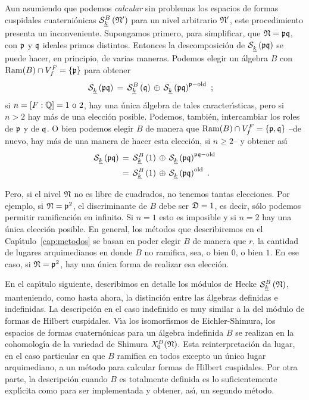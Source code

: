 Aun asumiendo que podemos \emph{calcular} sin problemas los espacios de formas
cuspidales cuaterni\'{o}nicas $\spitzH[B]{k}{\frak{N}'}$ para un nivel
arbitrario $\frak{N}'$, este procedimiento presenta un inconveniente.
Supongamos primero, para simplificar, que $\frak{N}=\frak{p}\frak{q}$, con
$\frak{p}$ y $\frak{q}$ ideales primos distintos. Entonces la
descomposici\'{o}n de $\spitzH{k}{\frak{p}\frak{q}}$ se puede hacer, en
principio, de varias maneras. Podemos elegir un \'{a}lgebra $B$ con
$\Ram(B)\cap\lugares[f]{F}=\{\frak{p}\}$ para obtener
\begin{align*}
	\spitzH{k}{\frak{p}\frak{q}} & \,=\, \spitzH[B]{k}{\frak{q}}\,\oplus\,
		\spitzH{k}{\frak{p}\frak{q}}^{\frak{p}-\oude}
	\text{ ;}
\end{align*}
%
si $n=[F:\bb{Q}]=1\text{ o }2$, hay una \'{u}nica \'{a}lgebra de tales
caracter\'{\i}sticas, pero si $n>2$ hay m\'{a}s de una elecci\'{o}n posible.
Podemos, tambi\'{e}n, intercambiar los roles de $\frak{p}$ y de $\frak{q}$.
O bien podemos elegir $B$ de manera que
$\Ram(B)\cap\lugares[f]{F}=\{\frak{p},\frak{q}\}$ --de nuevo, hay m\'{a}s
de una manera de hacer esta elecci\'{o}n, si $n\geq 2$-- y obtener as\'{\i}
\begin{align*}
	\spitzH{k}{\frak{p}\frak{q}} & \,=\, \spitzH[B]{k}{1}\,\oplus\,
		\spitzH{k}{\frak{p}\frak{q}}^{\frak{p}\frak{q}-\oude} \\
	& \,=\,\spitzH[B]{k}{1}\,\oplus\, \spitzH{k}{\frak{p}\frak{q}}^{\oude}
	\text{ .}
\end{align*}
%

Pero, si el nivel $\frak{N}$ no es libre de cuadrados, no tenemos tantas
elecciones. Por ejemplo, si $\frak{N}=\frak{p}^{2}$, el discriminante de $B$
debe ser $\frak{D}=1$, es decir, s\'{o}lo podemos permitir ramificaci\'{o}n en
infinito. Si $n=1$ esto es imposible y si $n=2$ hay una \'{u}nica elecci\'{o}n
posible. En general, los m\'{e}todos que describiremos en el
Cap\'{\i}tulo~\ref{cap:metodos} se basan en poder elegir $B$ de manera que $r$,
la cantidad de lugares arquimedianos en donde $B$ no ramifica, sea, o bien $0$,
o bien $1$. En ese caso, si $\frak{N}=\frak{p}^{2}$, hay una \'{u}nica forma de
realizar esa elecci\'{o}n.

En el cap\'{\i}tulo siguiente, describimos en detalle los m\'{o}dulos de Hecke
$\spitzH[B]{k}{\frak{N}}$, manteniendo, como hasta ahora, la distinci\'{o}n
entre las \'{a}lgebras definidas e indefinidas. La descripci\'{o}n en el caso
indefinido es muy similar a la del m\'{o}dulo de formas de Hilbert cuspidales.
V\'{\i}a los isomorfismos de Eichler-Shimura, los espacios de formas
cuatern\'{o}nicas para un \'{a}lgebra indefinida $B$ se realizan en la
cohomolog\'{\i}a de la variedad de Shimura $\shimura[B]{\frak{N}}$. Esta
reinterpretaci\'{o}n da lugar, en el caso particular en que $B$ ramifica en
todos excepto un \'{u}nico lugar arquimediano, a un m\'{e}todo para calcular
formas de Hilbert cuspidales. Por otra parte, la descripci\'{o}n cuando $B$ es
totalmente definida es lo suficientemente expl\'{\i}cita como para ser
implementada y obtener, as\'{\i}, un segundo m\'{e}todo.
